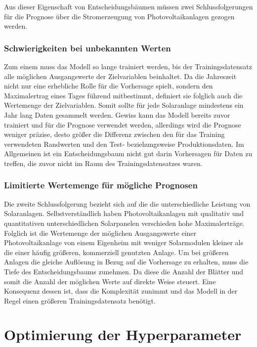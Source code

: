 \documentclass[12pt, a4paper]{article}
\begin{document}
Aus dieser Eigenschaft von Entscheidungsbäumen müssen zwei Schlussfolgerungen für die Prognose über die Stromerzeugung von Photovoltaikanlagen gezogen werden. 

\subsubsection{Schwierigkeiten bei unbekannten Werten}

Zum einem muss das Modell so lange trainiert werden, bis der Trainingsdatensatz alle möglichen Ausgangswerte der Zielvariablen beinhaltet. Da die Jahreszeit nicht nur eine erhebliche Rolle für die Vorhersage spielt, sondern den Maximalertrag eines Tages führend mitbestimmt, definiert sie folglich auch die Wertemenge der Zielvariablen. Somit sollte für jede Solaranlage mindestens ein Jahr lang Daten gesammelt werden. Gewiss kann das Modell bereits zuvor trainiert und für die Prognose verwendet werden, allerdings wird die Prognose weniger präzise, desto größer die Differenz zwischen den für das Training verwendeten Randwerten und den Test- beziehungsweise Produktionsdaten. Im Allgemeinen ist ein Entscheidungsbaum nicht gut darin Vorhersagen für Daten zu treffen, die zuvor nicht im Raum des Trainingsdatensatzes waren.

\subsubsection{Limitierte Wertemenge für mögliche Prognosen}

Die zweite Schlussfolgerung bezieht sich auf die die unterschiedliche Leistung von Solaranlagen. Selbstverständlich haben Photovoltaikanlagen mit qualitativ und quantitativen unterschiedlichen Solarpanelen verschieden hohe Maximalerträge. Folglich ist die Wertemenge der möglichen Ausgangswerte einer Photovoltaikanlage von einem Eigenheim mit weniger Solarmodulen kleiner als die einer häufig größeren, kommerziell genutzten Anlage. Um bei größeren Anlagen die gleiche Auflösung in Bezug auf die Vorhersage zu erhalten, muss die Tiefe des Entscheidungsbaums zunehmen. Da diese die Anzahl der Blätter und somit die Anzahl der möglichen Werte auf direkte Weise steuert. Eine Konsequenz dessen ist, dass die Komplexität zunimmt und das Modell in der Regel einen größeren Trainingsdatensatz benötigt.

\newpage

\section{Optimierung der Hyperparameter}
\end{document}
